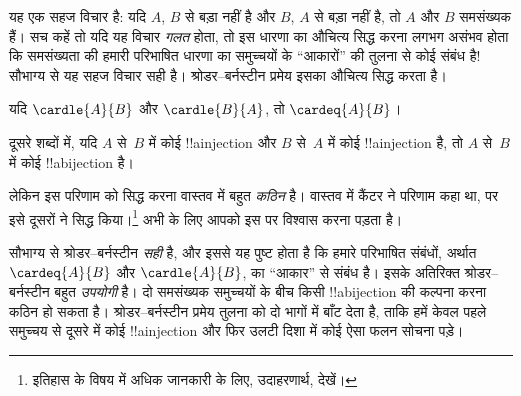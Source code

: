 \documentclass[../../../include/open-logic-section]{subfiles}
\begin{document}


\begin{explain}
यह एक सहज विचार है: यदि $A$, $B$ से बड़ा नहीं है और $B$, $A$ से बड़ा नहीं
है, तो $A$ और $B$ समसंख्यक हैं। सच कहें तो यदि यह विचार \emph{गलत} होता,
तो इस धारणा का औचित्य सिद्ध करना लगभग असंभव होता कि समसंख्यता की हमारी
परिभाषित धारणा का समुच्चयों के ``आकारों'' की तुलना से कोई संबंध है!{}
सौभाग्य से यह सहज विचार सही है। श्रोडर--बर्नस्टीन प्रमेय इसका औचित्य सिद्ध
करता है।
\end{explain}

\begin{thm}[श्रोडर--बर्नस्टीन]
	यदि $\cardle{A}{B}$ और $\cardle{B}{A}$,
	तो $\cardeq{A}{B}$।
\end{thm}

\begin{explain}
दूसरे शब्दों में, यदि $A$ से~$B$ में कोई !!a{injection} और $B$ से~$A$ में
कोई !!a{injection} है, तो $A$ से~$B$ में कोई !!a{bijection} है।

लेकिन इस परिणाम को सिद्ध करना वास्तव में बहुत \emph{कठिन} है। वास्तव में
कैंटर ने परिणाम कहा था, पर इसे दूसरों ने सिद्ध किया।\footnote{इतिहास के
विषय में अधिक जानकारी के लिए, उदाहरणार्थ,
\citet[pp.~165--6]{Potter2004} देखें।}
%
अभी के लिए आपको इस पर विश्वास करना पड़ता है।

सौभाग्य से श्रोडर--बर्नस्टीन \emph{सही} है, और इससे यह पुष्ट होता है कि
हमारे परिभाषित संबंधों, अर्थात $\cardeq{A}{B}$ और $\cardle{A}{B}$, का
``आकार'' से संबंध है। इसके अतिरिक्त श्रोडर--बर्नस्टीन बहुत \emph{उपयोगी}
है। दो समसंख्यक समुच्चयों के बीच किसी !!a{bijection} की कल्पना करना कठिन हो
सकता है। श्रोडर--बर्नस्टीन प्रमेय तुलना को दो भागों में बाँट देता है, ताकि
हमें केवल पहले समुच्चय से दूसरे में कोई !!a{injection} और फिर उलटी दिशा में
कोई ऐसा फलन सोचना पड़े।
\end{explain}
\end{document}
